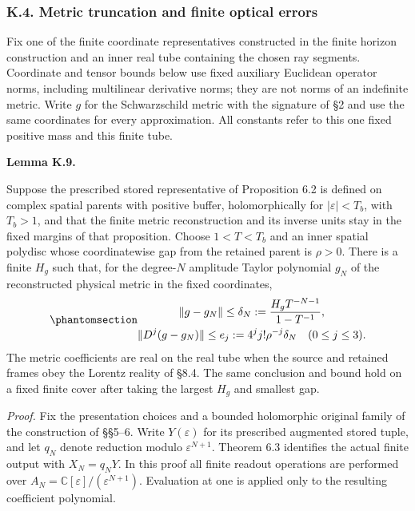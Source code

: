 \documentclass[
  english,
  11pt,
  reqno]{amsart}
\makeatletter
\newcommand{\pandocstatementheading}[1]{%
  \par\addpenalty{\@beginparpenalty}%
  \addvspace{.5\baselineskip plus .2\baselineskip minus .2\baselineskip}%
  {\normalfont\bfseries #1\par}%
  \nobreak\@afterindenttrue\@afterheading
}
\makeatother
\begin{document}
\protect{}\label{sec:sh-integrated-error}

\subsubsection{K.4. Metric truncation and finite optical
errors}\label{k.4.-metric-truncation-and-finite-optical-errors}

Fix one of the finite coordinate representatives constructed in the
finite horizon construction and an inner real tube containing the chosen
ray segments. Coordinate and tensor bounds below use fixed auxiliary
Euclidean operator norms, including multilinear derivative norms; they
are not norms of an indefinite metric. Write \(g\) for the Schwarzschild
metric with the signature of §2 and use the same coordinates for every
approximation. All constants refer to this one fixed positive mass and
this finite tube.

\pandocstatementheading{\protect{}\label{lem:sh-holomorphic-metric-tail}Lemma K.9.}

Suppose the prescribed stored representative of Proposition 6.2 is
defined on complex spatial parents with positive buffer, holomorphically
for \(|\varepsilon|<T_b\), with \(T_b>1\), and that the finite metric
reconstruction and its inverse units stay in the fixed margins of that
proposition. Choose \(1<T<T_b\) and an inner spatial polydisc whose
coordinatewise gap from the retained parent is \(\rho>0\). There is a
finite \(H_g\) such that, for the degree-\(N\) amplitude Taylor
polynomial \(g_N\) of the reconstructed physical metric in the fixed
coordinates,
\begin{equation}\protect\phantomsection\label{eq:sh-metric-tail-cauchy}{\begin{gathered}
\|g-g_N\|\le\delta_N:=\frac{H_gT^{-N-1}}{1-T^{-1}}, \\
\|D^j(g-g_N)\|\le e_j:=4^j j!\rho^{-j}\delta_N
 \quad(0\le j\le3).
\end{gathered}}\end{equation} The metric coefficients are real on the real tube when
the source and retained frames obey the Lorentz reality of §8.4. The
same conclusion and bound hold on a fixed finite cover after taking the
largest \(H_g\) and smallest gap.

\protect{}\label{sec:sh-r1-finite-readout-proof}

\emph{Proof.} Fix the presentation choices and a bounded holomorphic
original family of the construction of §§5--6. Write \(Y(\varepsilon)\)
for its prescribed augmented stored tuple, and let \(q_N\) denote
reduction modulo \(\varepsilon^{N+1}\). Theorem 6.3 identifies the
actual finite output with \(X_N=q_NY\). In this proof all finite readout
operations are performed over
\(A_N=\mathbb C[\varepsilon]/(\varepsilon^{N+1})\). Evaluation at one is
applied only to the resulting coefficient polynomial.
\end{document}
